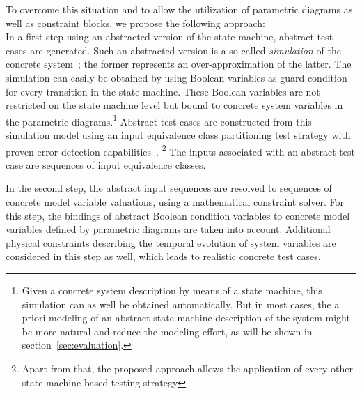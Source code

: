 To overcome this situation and to allow the utilization of parametric diagrams as well as constraint blocks, we propose the following approach:\\
In a first step using an abstracted version of the state machine, abstract test cases are generated. 
Such an abstracted version is a so-called \emph{simulation} of the concrete system~\cite{clarke_em-etal:1999a}; the former represents an over-approximation of the latter. The simulation can easily be obtained by using Boolean variables as guard condition for every transition in the state machine. These Boolean variables are not restricted on the state machine level but bound to concrete system variables in the parametric diagrams.\footnote{
Given a concrete system description by means of a state machine, this simulation can as well be obtained automatically. 
But in most cases, the a priori modeling of an abstract state machine description of the system might be more natural and reduce the modeling
effort, as will be shown in section~\ref{sec:evaluation}.}
Abstract test cases are constructed from this simulation model using an
input equivalence class partitioning 
test strategy with proven error detection capabilities~\cite{huang_complete_2014}. \footnote{Apart from that, the proposed approach allows the application of every other state machine based testing strategy}
The  inputs associated with an abstract test case are sequences of input equivalence classes.

In the second step, the abstract input sequences are resolved to sequences of concrete
model variable valuations, using a mathematical constraint solver. 
For this step,   the bindings of abstract Boolean
condition variables to concrete model variables defined by parametric diagrams are taken into account.
Additional physical constraints describing the temporal evolution  of system variables are considered
in this step as well, which leads to realistic concrete test cases. 

